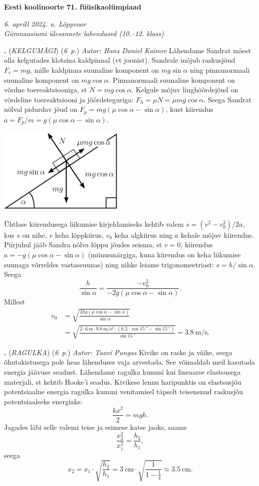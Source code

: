 \documentclass[11pt,a5paper]{article}
\newcommand{\numb}[1]{\vspace{5pt}\textbf{\large #1}}
\newcommand{\nimi}[1]{(\textsl{\small \uppercase{#1}})}
\newcommand{\punktid}[1]{(\emph{#1~p.})}
\newcounter{ylesanne}
\newcommand{\yl}[1]{\addtocounter{ylesanne}{1}\numb{\theylesanne.} \nimi{#1} \newblock{}}
\newcommand{\autor}[1]{\emph{Autor: #1}}%
\begin{document}
\begin{center}
  \textbf{\Large Eesti koolinoorte 71. füüsikaolümpiaad} \par
  \emph{6. aprill 2024. a. Lõppvoor \\Gümnaasiumi ülesannete lahendused (10.--12. klass)}
\end{center}

\yl{Kelgumägi}
\punktid{6} \autor{Hans Daniel Kaimre}
Lähendame Sandrat mäest alla kelgutades klotsina kaldpinnal (vt joonist). Sandrale mõjub raskusjõud $F_r=mg$, mille kaldpinna suunaline komponent on $mg\sin\alpha$ ning pinnanormaali suunaline komponent on $mg\cos\alpha$. Pinnanormaali suunaline komponent on võrdne toereaktsiooniga, st $N=mg\cos\alpha$. Kelgule mõjuv liughõõrdejõud on võrdeline toereaktsiooni ja jõõrdeteguriga: $F_h=\mu N=\mu mg\cos\alpha$. Seega Sandrat nõlval pidurdav jõud on $F_p = mg(\mu \cos\alpha - \sin\alpha)$, kust kiirendus $a=F_p/m=g(\mu \cos\alpha - \sin\alpha)$.
\begin{center}
\includegraphics[width=0.45\textwidth]{keha_slope.png}
\end{center}
Ühtlase kiirendusega liikumise kirjeldamiseks kehtib valem $s=(v^2-v_0^2)/2a$, kus $s$ on nihe, $v$ keha lõppkiirus, $v_0$ keha algkiirus ning $a$ kehale mõjuv kiirendus. Piirjuhul jääb Sandra nõlva lõppu jõudes seisma, st $v=0$, kiirendus $a=-g(\mu \cos\alpha - \sin\alpha)$ (miinusmärgiga, kuna kiirendus on keha liikumise suunaga võrreldes vastassuunas) ning nihke leiame trigonomeetriast: $s=h/\sin\alpha$. Seega
\[
  \frac{h}{\sin\alpha} = \frac{-v_0^2}{-2g(\mu \cos\alpha - \sin\alpha)}.
\]
Millest
\begin{align*}
  v_0 &= \sqrt{\frac{2hg(\mu \cos\alpha - \sin\alpha)}{\sin\alpha}}\\
  &= \sqrt{\frac{2\cdot\SI{6}{\m}\cdot \SI{9.8}{\m\per\s\squared}  \cdot (0.3\cdot \cos \SI{15}{\degree}  - \sin\SI{15}{\degree})}{\sin\SI{15}{\degree}}} = \SI{3.8}{\m\per\s}.
\end{align*}

\newpage
\yl{Ragulka}
\punktid{6} \autor{Taavi Pungas}
Kivike on raske ja väike, seega õhutakistusega pole heas lähenduses vaja arvestada. See võimaldab meil kasutada energia jäävuse seadust. Lähendame ragulka kummi kui lineaarse elastsusega materjali, st kehtib Hooke'i seadus. Kivikese lennu haripunktis on elastsusjõu potentsiaalne energia ragulka kummi venitamisel täpselt teisenenud raskusjõu potentsiaalseks energiaks:
\[
  \frac{kx^2}{2} = mgh.
\]
Jagades läbi selle valemi teise ja esimese katse jaoks, saame
\[
  \frac{x_2^2}{x_1^2} = \frac{h_2}{h_1},
\]
seega
\[
  x_2 = x_1 \cdot \sqrt{\frac{h_2}{h_1}} = \SI{3}{\cm} \cdot \sqrt{\frac{1}{1- \frac{1}{4}}} \approx \SI{3,5}{\cm}.
\]
\end{document}
